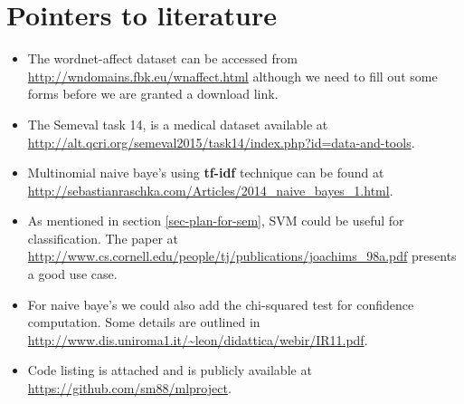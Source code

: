 \section{Pointers to literature}
\begin{itemize}
 \item The wordnet-affect dataset can be accessed from \url{http://wndomains.fbk.eu/wnaffect.html} although we need to fill out some forms before we are granted a download link.
 \item The Semeval task 14, is a medical dataset available at \url{http://alt.qcri.org/semeval2015/task14/index.php?id=data-and-tools}.
 \item Multinomial naive baye's using \textbf{tf-idf} technique can be found at \url{http://sebastianraschka.com/Articles/2014_naive_bayes_1.html}.
 \item As mentioned in section \ref{sec-plan-for-sem}, SVM could be useful for classification. The paper at \url{http://www.cs.cornell.edu/people/tj/publications/joachims_98a.pdf} presents a good use case.
 \item For naive baye's we could also add the chi-squared test for confidence computation. Some details are outlined in \url{http://www.dis.uniroma1.it/~leon/didattica/webir/IR11.pdf}.
 \item Code listing is attached and is publicly available at \url{https://github.com/sm88/mlproject}.
\end{itemize}

